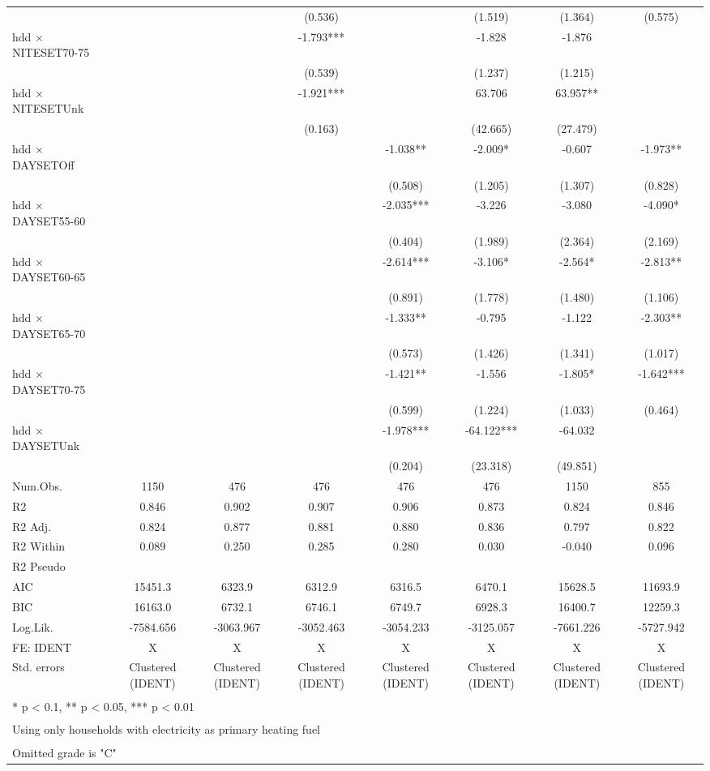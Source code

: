 \documentclass[
]{article}
\begin{document}
\begin{table}
{\begin{tabular}[t]{lccccccc}
 &  &  & (0.536) &  & (1.519) & (1.364) & (0.575)\\
hdd × NITESET70-75 &  &  & -1.793*** &  & -1.828 & -1.876 & \\
 &  &  & (0.539) &  & (1.237) & (1.215) & \\
hdd × NITESETUnk &  &  & -1.921*** &  & 63.706 & 63.957** & \\
 &  &  & (0.163) &  & (42.665) & (27.479) & \\
hdd × DAYSETOff &  &  &  & -1.038** & -2.009* & -0.607 & -1.973**\\
 &  &  &  & (0.508) & (1.205) & (1.307) & (0.828)\\
hdd × DAYSET55-60 &  &  &  & -2.035*** & -3.226 & -3.080 & -4.090*\\
 &  &  &  & (0.404) & (1.989) & (2.364) & (2.169)\\
hdd × DAYSET60-65 &  &  &  & -2.614*** & -3.106* & -2.564* & -2.813**\\
 &  &  &  & (0.891) & (1.778) & (1.480) & (1.106)\\
hdd × DAYSET65-70 &  &  &  & -1.333** & -0.795 & -1.122 & -2.303**\\
 &  &  &  & (0.573) & (1.426) & (1.341) & (1.017)\\
hdd × DAYSET70-75 &  &  &  & -1.421** & -1.556 & -1.805* & -1.642***\\
 &  &  &  & (0.599) & (1.224) & (1.033) & (0.464)\\
hdd × DAYSETUnk &  &  &  & -1.978*** & -64.122*** & -64.032 & \\
 &  &  &  & (0.204) & (23.318) & (49.851) & \\
\midrule
Num.Obs. & 1150 & 476 & 476 & 476 & 476 & 1150 & 855\\
R2 & 0.846 & 0.902 & 0.907 & 0.906 & 0.873 & 0.824 & 0.846\\
R2 Adj. & 0.824 & 0.877 & 0.881 & 0.880 & 0.836 & 0.797 & 0.822\\
R2 Within & 0.089 & 0.250 & 0.285 & 0.280 & 0.030 & -0.040 & 0.096\\
R2 Pseudo &  &  &  &  &  &  & \\
AIC & 15451.3 & 6323.9 & 6312.9 & 6316.5 & 6470.1 & 15628.5 & 11693.9\\
BIC & 16163.0 & 6732.1 & 6746.1 & 6749.7 & 6928.3 & 16400.7 & 12259.3\\
Log.Lik. & -7584.656 & -3063.967 & -3052.463 & -3054.233 & -3125.057 & -7661.226 & -5727.942\\
FE: IDENT & X & X & X & X & X & X & X\\
Std. errors & Clustered (IDENT) & Clustered (IDENT) & Clustered (IDENT) & Clustered (IDENT) & Clustered (IDENT) & Clustered (IDENT) & Clustered (IDENT)\\
\bottomrule
\multicolumn{8}{l}{\textsuperscript{} * p < 0.1, ** p < 0.05, *** p < 0.01}\\
\multicolumn{8}{l}{\textsuperscript{} Using only households with electricity as primary heating fuel}\\
\multicolumn{8}{l}{\textsuperscript{} Omitted grade is "C"}\\
\end{tabular}}
\end{table}
\end{document}
